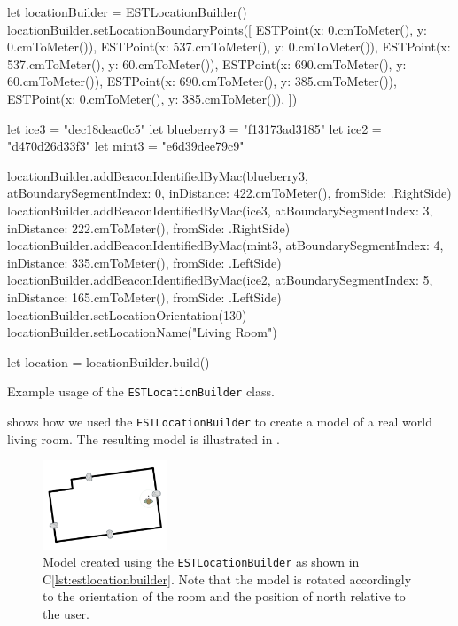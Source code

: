\begin{listing}
\begin{swiftcode}
        let locationBuilder = ESTLocationBuilder()
        locationBuilder.setLocationBoundaryPoints([
            ESTPoint(x: 0.cmToMeter(), y: 0.cmToMeter()),
            ESTPoint(x: 537.cmToMeter(), y: 0.cmToMeter()),
            ESTPoint(x: 537.cmToMeter(), y: 60.cmToMeter()),
            ESTPoint(x: 690.cmToMeter(), y: 60.cmToMeter()),
            ESTPoint(x: 690.cmToMeter(), y: 385.cmToMeter()),
            ESTPoint(x: 0.cmToMeter(), y: 385.cmToMeter()),
        ])
        
        let ice3 = "dec18deac0c5"
        let blueberry3 = "f13173ad3185"
        let ice2 = "d470d26d33f3"
        let mint3 = "e6d39dee79c9"
        
        locationBuilder.addBeaconIdentifiedByMac(blueberry3, atBoundarySegmentIndex: 0, inDistance: 422.cmToMeter(), fromSide: .RightSide)
        locationBuilder.addBeaconIdentifiedByMac(ice3, atBoundarySegmentIndex: 3, inDistance: 222.cmToMeter(), fromSide: .RightSide)
        locationBuilder.addBeaconIdentifiedByMac(mint3, atBoundarySegmentIndex: 4, inDistance: 335.cmToMeter(), fromSide: .LeftSide)
        locationBuilder.addBeaconIdentifiedByMac(ice2, atBoundarySegmentIndex: 5, inDistance: 165.cmToMeter(), fromSide: .LeftSide)
        locationBuilder.setLocationOrientation(130)
        locationBuilder.setLocationName("Living Room")
        
        let location = locationBuilder.build()
\end{swiftcode}
\caption{Example usage of the \texttt{ESTLocationBuilder} class.}
\label{lst:estlocationbuilder}
\end{listing}

 shows how we used the \texttt{ESTLocationBuilder} to create a model of a real world living room. 
The resulting model is illustrated in .

\begin{figure}[!htb]
  \centering
  \includegraphics[width=0.33\textwidth]{images/living-room}
  \caption{Model created using the \texttt{ESTLocationBuilder} as shown in C\ref{lst:estlocationbuilder}. Note that the model is rotated accordingly to the orientation of the room and the position of north relative to the user.}
  \label{fig:estlocationbuilder-livingroom}
\end{figure}

